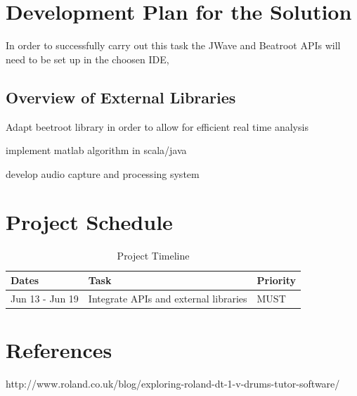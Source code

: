 \documentclass[a4paper, 11pt]{article}
\begin{document}
\maketitle{} 
\section{Development Plan for the Solution}

In order to successfully carry out this task the JWave and Beatroot APIs will need to be set up in the choosen IDE, 

\subsection{Overview of External Libraries}



Adapt beetroot library in order to allow for efficient real time analysis

implement matlab algorithm in scala/java

develop audio capture and processing system 

\maketitle{} 
\section{Project Schedule}

\begin{table}[H]
\caption{Project Timeline} 
\centering
\begin{tabular}{ | L |L| L |}
\hline\hline 
Dates & Task & Priority\\ [0.5ex]
\hline 
Jun 13 - Jun 19 & Integrate APIs and external libraries & MUST
\end{tabular}
\label{stages} 
\end{table}

\maketitle{} 
\section{References}
http://www.roland.co.uk/blog/exploring-roland-dt-1-v-drums-tutor-software/
\end{document}
